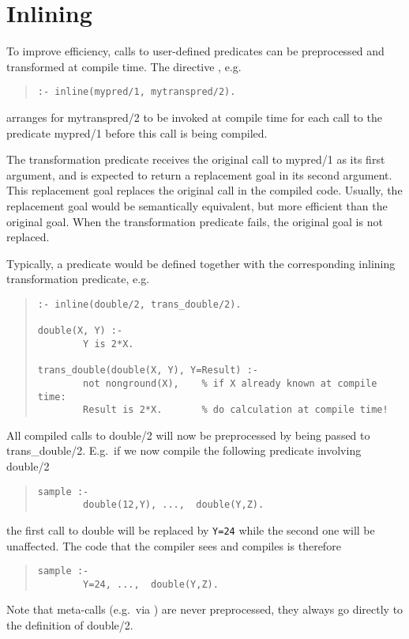 \section{Inlining}
To improve efficiency, calls to user-defined predicates can be
preprocessed and transformed at compile time.  The directive
, e.g.
\begin{quote} \begin{verbatim}
:- inline(mypred/1, mytranspred/2).
\end{verbatim} \end{quote}
arranges for mytranspred/2 to be invoked at compile time for each 
call to the predicate mypred/1 before this call is being compiled.

The transformation predicate receives the original call to mypred/1
as its first argument, and is expected to return a replacement goal
in its second argument. This replacement goal replaces the original
call in the compiled code. Usually, the replacement goal would be
semantically equivalent, but more efficient than the original goal.
When the transformation predicate fails, the original goal is not
replaced.

Typically, a predicate would be defined together with the corresponding
inlining transformation predicate, e.g.
\begin{quote} \begin{verbatim}
:- inline(double/2, trans_double/2).

double(X, Y) :-
        Y is 2*X.

trans_double(double(X, Y), Y=Result) :-
        not nonground(X),    % if X already known at compile time:
        Result is 2*X.       % do calculation at compile time!
\end{verbatim} \end{quote}
All compiled calls to double/2 will now be preprocessed by being passed
to trans_double/2.
E.g.\ if we now compile the following predicate involving double/2
\begin{quote} \begin{verbatim}
sample :-
        double(12,Y), ...,  double(Y,Z).
\end{verbatim} \end{quote}
the first call to double will be replaced by \verb+Y=24+ while the
second one will be unaffected. The code that the compiler sees and
compiles is therefore
\begin{quote} \begin{verbatim}
sample :-
        Y=24, ...,  double(Y,Z).
\end{verbatim} \end{quote}
Note that meta-calls (e.g.\ via
) are never
preprocessed, they always go directly to the definition of double/2.

